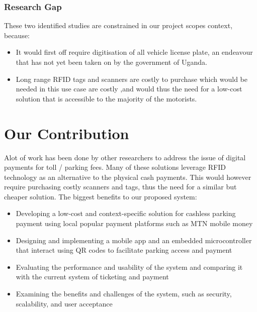 \subsubsection{Research Gap}
These two identified studies are constrained in our project scope\’s context, because:
\begin{itemize}
    \item It would first off require digitisation of all vehicle license plate, an endeavour that has not yet been taken on by the government of Uganda.
    \item Long range RFID tags and scanners are costly to purchase which would be needed in this use case are costly ,and would thus the need for a low-cost solution that is accessible to the majority of the motorists.
\end{itemize}



\clearpage


\section{Our Contribution}
Alot of work has been done by other researchers to address the issue of digital payments for toll / parking fees. Many of these solutions leverage RFID technology as an alternative to the physical cash payments. This would however require purchasing costly scanners and tags, thus the need for a similar but cheaper solution.
The biggest benefits to our proposed system:
\begin{itemize}
    \item Developing a low-cost and context-specific solution for cashless parking payment using local popular payment platforms such as MTN mobile money
    \item Designing and implementing a mobile app and an embedded microcontroller that interact using QR codes to facilitate parking access and payment
    \item Evaluating the performance and usability of the system and comparing it with the current system of ticketing and payment
    \item Examining the benefits and challenges of the system, such as security, scalability, and user acceptance
\end{itemize}
